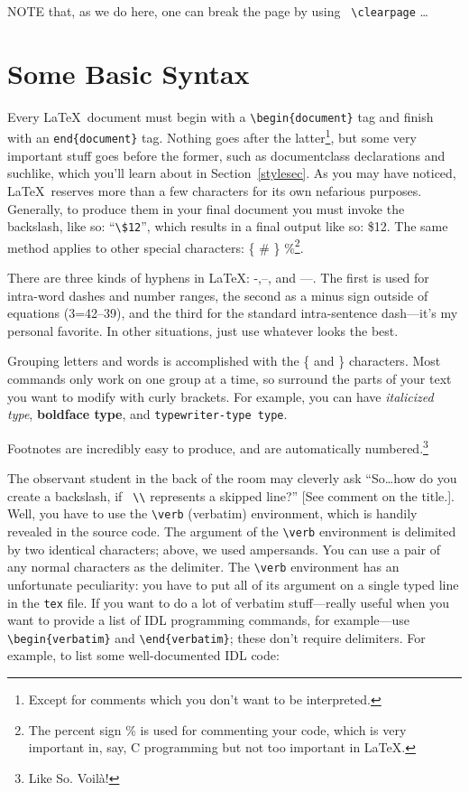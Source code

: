 \documentclass[12pt,preprint]{aastex}
\begin{document}
NOTE that, as we do here, one can break the page by using {\tt
  \verb&\&clearpage} \dots
\clearpage

\section{Some Basic Syntax}\label{basicsec}

Every \LaTeX\ document must begin with a \verb&\begin{document}& tag and
finish with an {\tt end\{document\}} tag.  Nothing goes after the
latter\footnote{Except for comments which you don't want to be
  interpreted.}, but some very important stuff goes before the former,
such as documentclass declarations and suchlike, which you'll learn
about in Section~\ref{stylesec}.
As you may have noticed, \LaTeX\ reserves more than a few characters for
its own nefarious purposes.  Generally, to produce them in your final
document you must invoke the backslash, like so: ``\verb&\$12&'', which
results in a final output like so: \$12.  The same method applies to other
special characters: \{ \# \} \%\footnote{The percent sign \% is used for
commenting your code, which is very important in, say, C programming but
not too important in \LaTeX.}.  

There are three kinds of hyphens in \LaTeX: -,--, and ---.  The first is
used for intra-word dashes and number ranges, the second as a minus sign
outside of equations (3=42--39), and the third for the standard
intra-sentence dash---it's my personal favorite.  In other situations,
just use whatever looks the best.

        Grouping letters and words is accomplished with the \{ and \}
characters.  Most commands only work on one group at a time, so surround
the parts of your text you want to modify with curly brackets. For
example, you can have {\it italicized type}, {\bf boldface type}, and
{\tt typewriter-type type}. 

        Footnotes are incredibly easy to produce, and are automatically
numbered.\footnote{Like So.  Voil\`{a}!}

The observant student in the back of the room may cleverly ask
``So\ldots how do you create a backslash, if \verb& \\& represents a
skipped line?'' [See comment on the title.].  Well, you have to use the
\verb&\verb& (verbatim) environment, which is handily revealed in the
source code.  The argument of the \verb$\verb$ environment is delimited
by two identical characters; above, we used ampersands. You can use a
pair of any normal characters as the delimiter. The \verb$\verb$
environment has an unfortunate peculiarity: you have to put all of its
argument on a single typed line in the \verb$tex$ file. If you want to
do a lot of verbatim stuff---really useful when you want to provide a
list of IDL programming commands, for example---use
\verb$\begin{verbatim}$ and \verb$\end{verbatim}$; these don't require
delimiters. For example, to list some well-documented IDL code:
\end{document}
